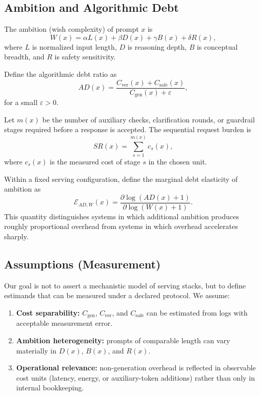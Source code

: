 \documentclass{svjour3}
\begin{document}
\subsection{Ambition and Algorithmic Debt}
\begin{definition}
The ambition (wish complexity) of prompt $x$ is
\[
W(x)=\alpha L(x)+\beta D(x)+\gamma B(x)+\delta R(x),
\]
where $L$ is normalized input length, $D$ is reasoning depth, $B$ is conceptual breadth, and $R$ is safety sensitivity.
\end{definition}

\begin{definition}
Define the algorithmic debt ratio as
\[
AD(x)=\frac{C_{\text{ver}}(x)+C_{\text{safe}}(x)}{C_{\text{gen}}(x)+\varepsilon},
\]
for a small $\varepsilon>0$.
\end{definition}

\begin{definition}
Let $m(x)$ be the number of auxiliary checks, clarification rounds, or guardrail stages required before a response is accepted. The sequential request burden is
\[
SR(x)=\sum_{s=1}^{m(x)} c_s(x),
\]
where $c_s(x)$ is the measured cost of stage $s$ in the chosen unit.
\end{definition}

\begin{definition}
Within a fixed serving configuration, define the marginal debt elasticity of ambition as
\[
\mathcal{E}_{AD,W}(x)=\frac{\partial \log(AD(x)+1)}{\partial \log(W(x)+1)}.
\]
This quantity distinguishes systems in which additional ambition produces roughly proportional overhead from systems in which overhead accelerates sharply.
\end{definition}

\subsection{Assumptions (Measurement)}
Our goal is not to assert a mechanistic model of serving stacks, but to define estimands that can be measured under a declared protocol. We assume:
\begin{enumerate}[leftmargin=*]
\item \textbf{Cost separability:} $C_{\text{gen}}$, $C_{\text{ver}}$, and $C_{\text{safe}}$ can be estimated from logs with acceptable measurement error.
\item \textbf{Ambition heterogeneity:} prompts of comparable length can vary materially in $D(x)$, $B(x)$, and $R(x)$.
\item \textbf{Operational relevance:} non-generation overhead is reflected in observable cost units (latency, energy, or auxiliary-token additions) rather than only in internal bookkeeping.
\end{enumerate}
\end{document}

